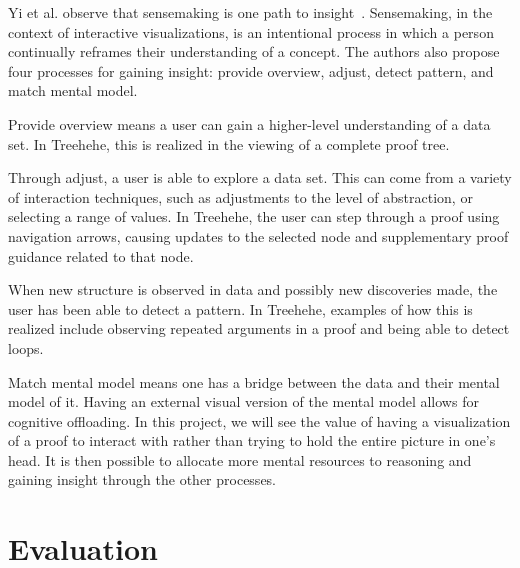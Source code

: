 \documentclass[journal]{vgtc}                %
\newcommand{\projectname}{Treehehe}
\begin{document}

Yi et al. observe that sensemaking is one path to insight~\cite{insights-yi+etal}. Sensemaking, in the context of interactive visualizations, is an intentional process in which a person continually reframes their understanding of a concept. The authors also propose four processes for gaining insight: provide overview, adjust, detect pattern, and match mental model.

Provide overview means a user can gain a higher-level understanding of a data set. In \projectname{}, this is realized in the viewing of a complete proof tree.

Through adjust, a user is able to explore a data set. This can come from a variety of interaction techniques, such as adjustments to the level of abstraction, or selecting a range of values. In \projectname{}, the user can step through a proof using navigation arrows, causing updates to the selected node and supplementary proof guidance related to that node.

When new structure is observed in data and possibly new discoveries made, the user has been able to detect a pattern. In \projectname{}, examples of how this is realized include observing repeated arguments in a proof and being able to detect loops.

Match mental model means one has a bridge between the data and their mental model of it. Having an external visual version of the mental model allows for cognitive offloading. In this project, we will see the value of having a visualization of a proof to interact with rather than trying to hold the entire picture in one’s head. It is then possible to allocate more mental resources to reasoning and gaining insight through the other processes.


\section{Evaluation}
\label{sec:evaluation}

\end{document}
